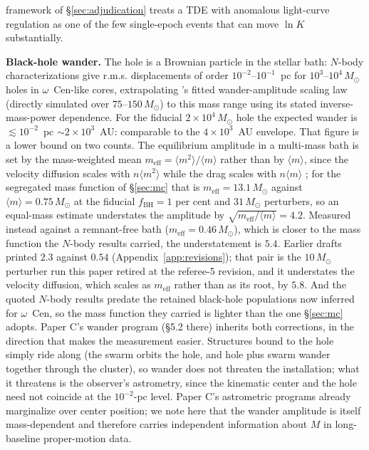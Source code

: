 \documentclass[11pt]{article}
\newcommand{\msun}{\ensuremath{M_\odot}}
\newcommand{\ocen}{\ensuremath{\omega}~Cen}
\newcommand{\lnK}{\ensuremath{\ln K}}
\begin{document}
framework of \S\ref{sec:adjudication} treats a TDE with anomalous light-curve regulation as one of the few single-epoch events that can move \lnK{} substantially.

\textbf{Black-hole wander.} The hole is a Brownian particle in the stellar bath: $N$-body characterizations give r.m.s. displacements of order $10^{-2}$--$10^{-1}$~pc for $10^{3}$--$10^{4}\,\msun$ holes in \ocen-like cores, extrapolating \citet{deVita2018}'s fitted wander-amplitude scaling law (directly simulated over $75$--$150\,\msun$) to this mass range using its stated inverse-mass-power dependence. For the fiducial $2\times10^{4}\,\msun$ hole the expected wander is $\lesssim 10^{-2}$~pc $\sim 2\times10^{3}$~AU: comparable to the $4\times10^{3}$~AU envelope. That figure is a lower bound on two counts. The equilibrium amplitude in a multi-mass bath is set by the mass-weighted mean $m_{\mathrm{eff}} = \langle m^{2}\rangle/\langle m\rangle$ rather than by $\langle m \rangle$, since the velocity diffusion scales with $n\langle m^{2}\rangle$ while the drag scales with $n\langle m\rangle$ \citep{ChatterjeeHernquistLoeb2002,MerrittBerczikLaun2007}; for the segregated mass function of \S\ref{sec:mc} that is $m_{\mathrm{eff}} = 13.1\,\msun$ against $\langle m\rangle = 0.75\,\msun$ at the fiducial $f_{\mathrm{BH}} = 1$ per cent and $31\,\msun$ perturbers, so an equal-mass estimate understates the amplitude by $\sqrt{m_{\mathrm{eff}}/\langle m\rangle} = 4.2$. Measured instead against a remnant-free bath ($m_{\mathrm{eff}} = 0.46\,\msun$), which is closer to the mass function the $N$-body results carried, the understatement is $5.4$. Earlier drafts printed $2.3$ against $0.54$ (Appendix~\ref{app:revisions}); that pair is the $10\,\msun$ perturber run this paper retired at the referee-5 revision, and it understates the velocity diffusion, which scales as $m_{\mathrm{eff}}$ rather than as its root, by $5.8$. And the quoted $N$-body results predate the retained black-hole populations now inferred for \ocen, so the mass function they carried is lighter than the one \S\ref{sec:mc} adopts. Paper C's wander program (\S5.2 there) inherits both corrections, in the direction that makes the measurement easier. Structures bound to the hole simply ride along (the swarm orbits the hole, and hole plus swarm wander together through the cluster), so wander does not threaten the installation; what it threatens is the observer's astrometry, since the kinematic center and the hole need not coincide at the $10^{-2}$-pc level. Paper C's astrometric programs already marginalize over center position; we note here that the wander amplitude is itself mass-dependent and therefore carries independent information about $M$ in long-baseline proper-motion data.
\end{document}
